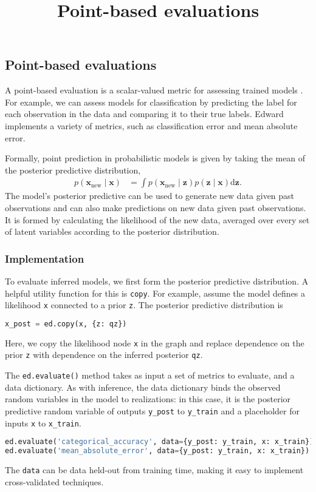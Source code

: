 \title{Point-based evaluations}

\subsection{Point-based evaluations}

A point-based evaluation is a scalar-valued metric for assessing
trained models \citep{gneiting2007strictly}.
For example, we can assess models for classification
by predicting the label for each observation in the data and comparing
it to their true labels. Edward implements a variety of metrics, such
as classification error and mean absolute error.

Formally, point prediction in probabilistic models is given by
taking the mean of the posterior predictive distribution,
\begin{align*}
  p(\mathbf{x}_\text{new} \mid \mathbf{x})
  &=
  \int
  p(\mathbf{x}_\text{new} \mid \mathbf{z})
  p(\mathbf{z} \mid \mathbf{x})
  \text{d} \mathbf{z}.
\end{align*}
The model's posterior predictive can be used to generate new data
given past observations and can also make predictions on new data
given past observations.
It is formed by calculating the likelihood of the new data, averaged
over every set of latent variables according to the posterior
distribution.

\subsubsection{Implementation}

To evaluate inferred models, we first form the posterior
predictive distribution. A helpful utility function for this is
\texttt{copy}. For example,
assume the model defines a likelihood \texttt{x} connected to a prior
\texttt{z}. The posterior predictive distribution is
\begin{lstlisting}[language=Python]
x_post = ed.copy(x, {z: qz})
\end{lstlisting}
Here, we copy the likelihood node \texttt{x} in the graph and replace dependence
on the prior \texttt{z} with dependence on the inferred posterior \texttt{qz}.

The \texttt{ed.evaluate()} method takes as input a set of metrics to
evaluate, and a data dictionary. As with inference, the data dictionary binds the
observed random variables in the model to realizations: in this case,
it is the posterior predictive random variable of outputs \texttt{y_post} to
\texttt{y_train} and a placeholder for inputs \texttt{x} to
\texttt{x_train}.
\begin{lstlisting}[language=Python]
ed.evaluate('categorical_accuracy', data={y_post: y_train, x: x_train})
ed.evaluate('mean_absolute_error', data={y_post: y_train, x: x_train})
\end{lstlisting}
The \texttt{data} can be data held-out from training time, making it
easy to implement cross-validated techniques.

